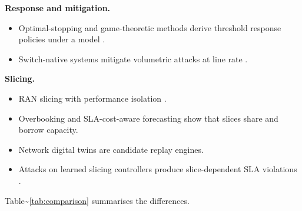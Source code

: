 \textbf{Response and mitigation.}

\begin{itemize}
\tightlist
\item
  Optimal-stopping and game-theoretic methods derive threshold response
  policies under a model
  \cite{hammar2022optimalstopping, hammar2024dynamic, zonouz2014rre}.
\item
  Switch-native systems mitigate volumetric attacks at line rate
  \cite{liu2021jaqen}.
\end{itemize}

\textbf{Slicing.}

\begin{itemize}
\tightlist
\item
  RAN slicing with performance isolation \cite{foukas2017orion}.
\item
  Overbooking \cite{salvat2018overbooking} and SLA-cost-aware
  forecasting \cite{bega2019deepcog} show that slices share and borrow
  capacity.
\item
  Network digital twins \cite{ferriolgalmes2023routenetfermi} are
  candidate replay engines.
\item
  Attacks on learned slicing controllers produce slice-dependent SLA
  violations \cite{tashman2026adversarial}.
\end{itemize}

Table\textasciitilde{}\ref{tab:comparison} summarises the differences.

